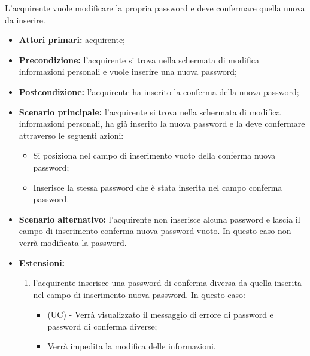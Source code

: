 L'acquirente vuole modificare la propria password e deve confermare quella nuova da inserire.
\begin{itemize}
    \item \textbf{Attori primari:} acquirente;
    \item \textbf{Precondizione:} l'acquirente si trova nella schermata di modifica informazioni personali e vuole inserire una nuova password;
    \item \textbf{Postcondizione:} l'acquirente ha inserito la conferma della nuova password;
    \item \textbf{Scenario principale:} l'acquirente si trova nella schermata di modifica informazioni personali, ha già inserito la nuova password e la deve confermare attraverso le seguenti azioni:
        \begin{itemize}
            \item Si posiziona nel campo di inserimento vuoto della conferma nuova password;
            \item Inserisce la stessa password che è stata inserita nel campo conferma password.
        \end{itemize}
    \item \textbf{Scenario alternativo:} l'acquirente non inserisce alcuna password e lascia il campo di inserimento conferma nuova password vuoto. In questo caso non verrà modificata la password.
    \item \textbf{Estensioni:} \begin{enumerate}[label=\lett] 
    \item l'acquirente inserisce una password di conferma diversa da quella inserita nel campo di inserimento nuova password. In questo caso:
    \begin{itemize}
        \item (UC) - Verrà visualizzato il messaggio di errore di password e password di conferma diverse;
        \item Verrà impedita la modifica delle informazioni.
    \end{itemize}
\end{enumerate}
\end{itemize}


